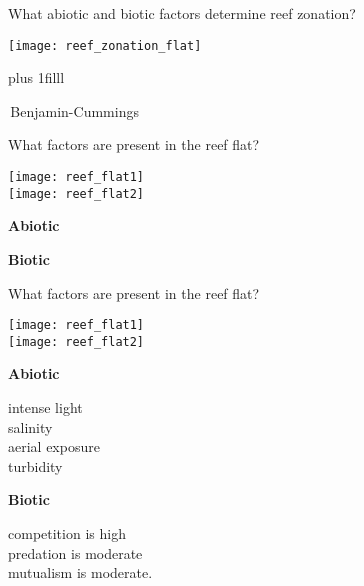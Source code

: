 \documentclass[t,handout]{beamer}  %
\begin{document}

\begin{frame}[t]{What abiotic and biotic factors determine reef zonation?}

\texttt{[image: reef\_zonation\_flat]}

\vskip0pt plus 1filll

\tiny\textcopyright\,Benjamin-Cummings
\end{frame}

\begin{frame}[t]{What factors are present in the reef flat?}

\begin{multicols}{2}
	\begin{center}
	
	\texttt{[image: reef\_flat1]}\\[1ex]
	
	\texttt{[image: reef\_flat2]}
	\end{center}
\columnbreak

	\hangpara\textbf{Abiotic}
	
	\vspace*{4\baselineskip}
	
	\hangpara\textbf{Biotic}
	
	
\end{multicols}
\end{frame}

\begin{frame}[t]{What factors are present in the reef flat?}

\begin{multicols}{2}
	\begin{center}
	
	\texttt{[image: reef\_flat1]}\\[1ex]
	
	\texttt{[image: reef\_flat2]}
	\end{center}
\columnbreak

	\hangpara\textbf{Abiotic}
	
	\hangpara intense light\\\pause salinity\\\pause aerial exposure\\\pause turbidity

	\hangpara\textbf{Biotic}
	
	\hangpara competition is high\\\pause predation is moderate\\\pause mutualism is moderate.

	
\end{multicols}
\end{frame}
\end{document}
